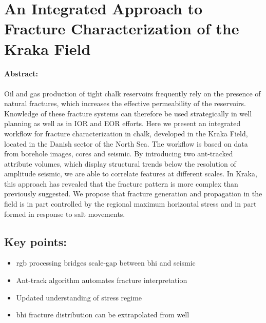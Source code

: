 \section{An Integrated Approach to Fracture Characterization of the Kraka Field}
\label{sec:tala}

\paragraph{Abstract:} Oil and gas production of tight chalk reservoirs frequently rely on the presence of natural fractures, which increases the effective permeability of the reservoirs.  Knowledge of these fracture systems can therefore be used strategically in well planning as well as in IOR and EOR efforts.  Here we present an integrated workflow for fracture characterization in chalk, developed in the Kraka Field, located in the Danish sector of the North Sea.  The workflow is based on data from borehole images, cores and seismic.  By introducing two ant-tracked attribute volumes, which display structural trends below the resolution of amplitude seismic, we are able to correlate features at different scales.  In Kraka, this approach has revealed that the fracture pattern is more complex than previously suggested.  We propose that fracture generation and propagation in the field is in part controlled by the regional maximum horizontal stress and in part formed in response to salt movements.

\subsection*{Key points:}
\begin{itemize}
    \item \acf{rgb} processing bridges scale-gap between \acf{bhi} and seismic
    \item Ant-track algorithm automates fracture interpretation
    \item Updated understanding of stress regime
    \item \ac{bhi} fracture distribution can be extrapolated from well 
\end{itemize}

{\vfill\hfill\newline{}}


